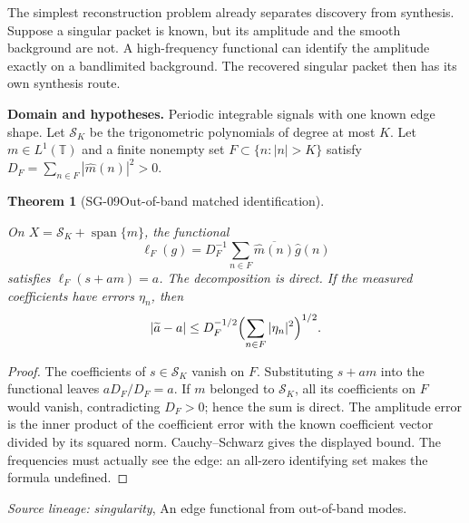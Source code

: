\documentclass[11pt]{article}
\newtheorem{theorem}{Theorem}[section]
\theoremstyle{definition}\newtheorem{definition}[theorem]{Definition}
\theoremstyle{remark}\newtheorem{remark}[theorem]{Remark}
\begin{document}
The simplest reconstruction problem already separates discovery from
synthesis. Suppose a singular packet is known, but its amplitude and the
smooth background are not. A high-frequency functional can identify the
amplitude exactly on a bandlimited background. The recovered singular packet
then has its own synthesis route.


\par{\small\textbf{Domain and hypotheses.} Periodic integrable signals with one known edge shape. Let $\mathcal S_K$ be the trigonometric polynomials of degree at most $K$. Let $m\in L^1(\mathbb T)$ and a finite nonempty set $F\subset\{n:|n|>K\}$ satisfy $D_F=\sum_{n\in F}|\widehat m(n)|^2>0$.}\par
\begin{theorem}[SG-09\quad Out-of-band matched identification]\label{SG-09}

On $X=\mathcal S_K+\operatorname{span}\{m\}$, the functional
\[
 \ell_F(g)=D_F^{-1}\sum_{n\in F}\overline{\widehat m(n)}\widehat g(n)
\]
satisfies $\ell_F(s+am)=a$. The decomposition is direct. If the measured
coefficients have errors $\eta_n$, then
\[
 |\widetilde a-a|\le D_F^{-1/2}\Bigl(\sum_{n\in F}|\eta_n|^2\Bigr)^{1/2}.
\]

\end{theorem}
\begin{proof}

The coefficients of $s\in\mathcal S_K$ vanish on $F$. Substituting $s+am$
into the functional leaves $aD_F/D_F=a$. If $m$ belonged to $\mathcal S_K$,
all its coefficients on $F$ would vanish, contradicting $D_F>0$; hence the
sum is direct. The amplitude error is the inner product of the coefficient
error with the known coefficient vector divided by its squared norm.
Cauchy--Schwarz gives the displayed bound. The frequencies must actually see
the edge: an all-zero identifying set makes the formula undefined.

\end{proof}

\par{\small\color{Teal}\textit{Source lineage:} \textit{singularity}, An edge functional from out-of-band modes.}\par
\end{document}
